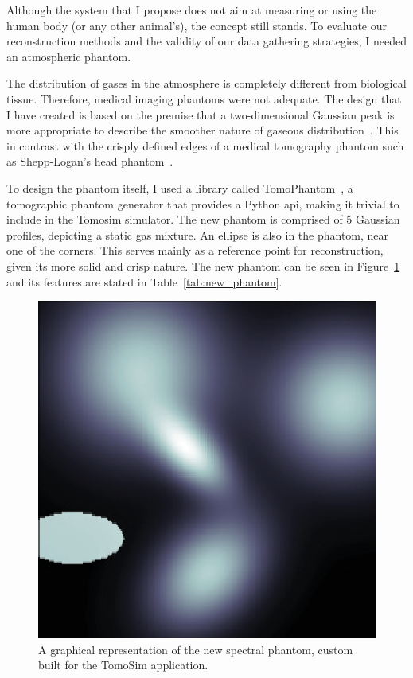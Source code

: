 Although the system that I propose does not aim at measuring or using
the human body (or any other animal's), the concept still stands. To
evaluate our reconstruction methods and the validity of our data
gathering strategies, I needed an atmospheric phantom.

The distribution of gases in the atmosphere is completely different from
biological tissue. Therefore, medical imaging phantoms were not
adequate. The design that I have created is based on the premise that a
two-dimensional Gaussian peak is more appropriate to describe the
smoother nature of gaseous distribution~\cite{Stachniss2009}. This in
contrast with the crisply defined edges of a medical tomography phantom
such as Shepp-Logan's head phantom~\cite{Shepp1974}.

To design the phantom itself, I used a library called
TomoPhantom~\cite{Kazantsev2018}, a tomographic phantom generator that
provides a Python \gls{api}, making it trivial to include in the Tomosim
simulator. The new phantom is comprised of 5 Gaussian profiles,
depicting a static gas mixture. An ellipse is also in the phantom, near
one of the corners. This serves mainly as a reference point for
reconstruction, given its more solid and crisp nature. The new phantom
can be seen in Figure~\ref{fig:new_phantom} and its features are stated
in Table~\ref{tab:new_phantom}.


\begin{figure}[htpb]
    \centering
    \includegraphics[width=.8\textwidth]{img/eps/original_phantom.eps}
    \caption{A graphical representation of the new spectral phantom,
    custom built for the TomoSim application.}
    \label{fig:new_phantom}
\end{figure}


